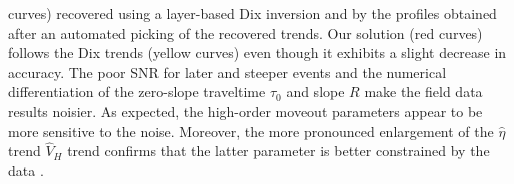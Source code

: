  curves) recovered using a layer-based \tx Dix inversion
 \citep{ferla:296} and by the profiles obtained after an automated
 picking of the recovered trends. Our solution (red curves) follows
 the Dix trends (yellow curves) even though it exhibits a slight
 decrease in accuracy.  The poor SNR for later and steeper events and
 the numerical differentiation of the zero-slope traveltime $\tau_0$
 and slope $R$ make the field data results noisier. As expected, the
 high-order moveout parameters appear to be more sensitive to the
 noise. Moreover, the more pronounced enlargement of the $\hat{\eta}$
 trend   $\hat{V}_H$ trend
 confirms that the latter parameter is better constrained by the data
 \citep{ilyabook2006}.










